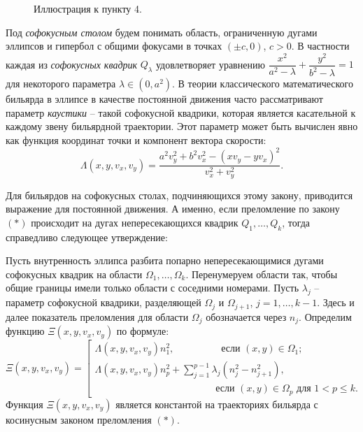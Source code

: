 \begin{figure}[!htb]
    \caption{Иллюстрация к пункту 4.}
    \label{fig:intro_example3}
\endminipage\hfill
\end{figure}

Под \textit{софокусным столом} будем понимать область, ограниченную дугами эллипсов и гипербол с общими фокусами в точках $(\pm c, 0)$, $c > 0$. В частности каждая из \textit{софокусных квадрик} $Q_\lambda$ удовлетворяет уравнению $\dfrac{x^2}{a^2-\lambda} +\dfrac{y^2}{b^2-\lambda} = 1$ для некоторого параметра  $\lambda \in (0, a^2)$.
В теории классического математического бильярда в эллипсе в качестве постоянной движения часто рассматривают параметр \textit{каустики} -- такой софокусной квадрики, которая является касательной к каждому звену бильярдной траектории. Этот параметр может быть вычислен явно как функция координат точки и компонент вектора скорости:
$$\Lambda(x, y, v_x, v_y) =  \dfrac{a^2 v_y^2 + b^2v_x^2 - (x v_y-y v_x)^2}{v_x^2 + v_y^2}.$$

Для бильярдов на софокусных столах, подчиняющихся этому закону, приводится выражение для постоянной движения.
А именно, если преломление по закону $(\ast)$ происходит на дугах непересекающихся квадрик $Q_1, \ldots, Q_k$, тогда справедливо следующее утверждение:

\begin{theorem}
Пусть внутренность эллипса разбита попарно непересекающимися дугами софокусных квадрик на области $\Omega_1, \ldots, \Omega_k$. Перенумеруем области так, чтобы общие границы имели только области с соседними номерами. Пусть $\lambda_j$ -- параметр софокусной квадрики, разделяющей $\Omega_j$ и $\Omega_{j+1}$, $j=1, \ldots, k-1$. Здесь и далее показатель преломления для области $\Omega_j$ обозначается через $n_j$.
Определим функцию $\Xi(x, y, v_x, v_y)$ по формуле: 
\begin{equation*}
\Xi(x, y, v_x, v_y) = \left[
\begin{array}{ll}
    \Lambda(x, y, v_x, v_y) n_1^2, \qquad  \ \ \qquad   \text{ если } (x,y) \in \Omega_1 ;
    \\
    \Lambda(x, y, v_x, v_y) n_p^2 + \sum_{j=1}^{p-1} \lambda_j(n_j^2-n_{j+1}^2), \\
     \qquad \qquad \qquad \qquad \qquad \qquad  \text{ если } (x,y) \in \Omega_p \text{ для } 1 < p \leq k. 
\end{array}
\right.
\end{equation*}
Функция $\Xi(x, y, v_x, v_y)$ является константой на траекториях бильярда с косинусным законом преломления $(\ast)$.
\label{th:intro_non_intersecting}
\end{theorem}

